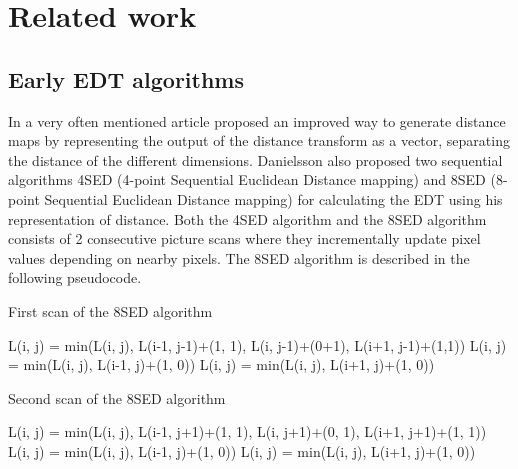 \chapter{Related work}\label{cha:relatedwork}
\section{Early EDT algorithms}\label{earlyedt}
In a very often mentioned article \citet{Danielsson} proposed an improved way to generate distance maps by representing the output of the distance transform as a vector, separating the distance of the different dimensions. Danielsson also proposed two sequential algorithms 4SED (4-point Sequential Euclidean Distance mapping) and 8SED (8-point Sequential Euclidean Distance mapping) for calculating the EDT using his representation of distance. Both the 4SED algorithm and the 8SED algorithm consists of 2 consecutive picture scans where they incrementally update pixel values depending on nearby pixels. The 8SED algorithm is described in the following pseudocode.\vspace{\baselineskip}\newline
\begin{algorithm}[H]
\caption{First scan of the 8SED algorithm}
\begin{algorithmic}
		\State L(i, j) = min(L(i, j), L(i-1, j-1)+(1, 1), L(i, j-1)+(0+1), L(i+1, j-1)+(1,1))\;
	\EndFor
		\State L(i, j) = min(L(i, j), L(i-1, j)+(1, 0))\;
	\EndFor
		\State L(i, j) = min(L(i, j), L(i+1, j)+(1, 0))\;
	\EndFor
\EndFor
\end{algorithmic}
\end{algorithm}
\vspace{\baselineskip}
\begin{algorithm}
\caption{Second scan of the 8SED algorithm}
\begin{algorithmic}[H]
		\State L(i, j) = min(L(i, j), L(i-1, j+1)+(1, 1), L(i, j+1)+(0, 1), L(i+1, j+1)+(1, 1))\;
	\EndFor
		\State L(i, j) = min(L(i, j), L(i-1, j)+(1, 0))\;
	\EndFor
		\State L(i, j) = min(L(i, j), L(i+1, j)+(1, 0))\;
	\EndFor
\EndFor
\end{algorithmic}
\end{algorithm}\vspace{\baselineskip}

